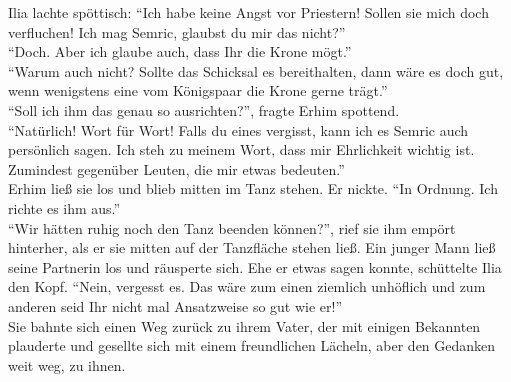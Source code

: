 Ilia lachte spöttisch: ``Ich habe keine Angst vor Priestern! Sollen sie mich doch verfluchen! Ich 
mag Semric, glaubst du mir das nicht?''\\
``Doch. Aber ich glaube auch, dass Ihr die Krone mögt.''\\
``Warum auch nicht? Sollte das Schicksal es bereithalten, dann wäre es doch gut, wenn wenigstens 
eine vom Königspaar die Krone gerne trägt.''\\
``Soll ich ihm das genau so ausrichten?'', fragte Erhim spottend.\\
``Natürlich! Wort für Wort! Falls du eines vergisst, kann ich es Semric auch persönlich sagen. Ich 
steh zu meinem Wort, dass mir Ehrlichkeit wichtig ist. Zumindest gegenüber Leuten, die mir etwas 
bedeuten.''\\
Erhim ließ sie los und blieb mitten im Tanz stehen. Er nickte. ``In Ordnung. Ich richte es ihm 
aus.''\\
``Wir hätten ruhig noch den Tanz beenden können?'', rief sie ihm empört hinterher, als er sie 
mitten auf der Tanzfläche stehen ließ. Ein junger Mann ließ seine Partnerin los und räusperte sich. 
Ehe er etwas sagen konnte, schüttelte Ilia den Kopf. ``Nein, vergesst es. Das wäre zum einen 
ziemlich unhöflich und zum anderen seid Ihr nicht mal Ansatzweise so gut wie er!''\\
Sie bahnte sich einen Weg zurück zu ihrem Vater, der mit einigen Bekannten plauderte und gesellte 
sich mit einem freundlichen Lächeln, aber den Gedanken weit weg, zu ihnen.\\


